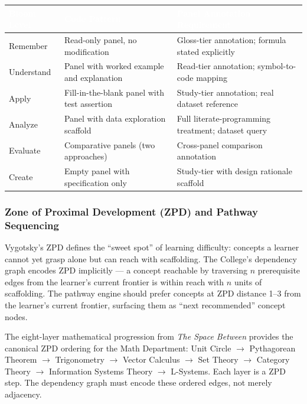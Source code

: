 \documentclass[11pt,letterpaper]{article}
\newcommand{\tableheader}[1]{\textbf{\sffamily\textcolor{white}{#1}}}
\begin{document}
\begin{center}
\begin{tabularx}{\textwidth}{L{2.5cm}L{3cm}X}
\toprule
{}
\tableheader{Bloom Level} & \tableheader{Code Pattern} & \tableheader{Panel Annotation Requirement} \\
\midrule
Remember & Read-only panel, no modification & Gloss-tier annotation; formula stated explicitly \\
Understand & Panel with worked example and explanation & Read-tier annotation; symbol-to-code mapping \\
Apply & Fill-in-the-blank panel with test assertion & Study-tier annotation; real dataset reference \\
Analyze & Panel with data exploration scaffold & Full literate-programming treatment; dataset query \\
Evaluate & Comparative panels (two approaches) & Cross-panel comparison annotation \\
Create & Empty panel with specification only & Study-tier with design rationale scaffold \\
\bottomrule
\end{tabularx}
\end{center}

\subsubsection{Zone of Proximal Development (ZPD) and Pathway Sequencing}

Vygotsky's ZPD defines the ``sweet spot'' of learning difficulty: concepts a learner cannot yet grasp alone but can reach with scaffolding. The College's dependency graph encodes ZPD implicitly --- a concept reachable by traversing $n$ prerequisite edges from the learner's current frontier is within reach with $n$ units of scaffolding. The pathway engine should prefer concepts at ZPD distance 1--3 from the learner's current frontier, surfacing them as ``next recommended'' concept nodes.

The eight-layer mathematical progression from \textit{The Space Between} provides the canonical ZPD ordering for the Math Department: Unit Circle $\rightarrow$ Pythagorean Theorem $\rightarrow$ Trigonometry $\rightarrow$ Vector Calculus $\rightarrow$ Set Theory $\rightarrow$ Category Theory $\rightarrow$ Information Systems Theory $\rightarrow$ L-Systems. Each layer is a ZPD step. The dependency graph must encode these ordered edges, not merely adjacency.
\end{document}
